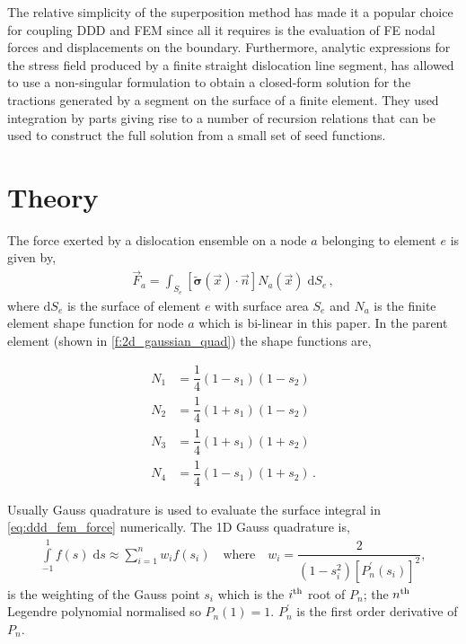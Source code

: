 \documentclass[11pt]{iopart}
\begin{document}
The relative simplicity of the superposition method has made it a popular choice for coupling DDD and FEM since all it requires is the evaluation of FE nodal forces and displacements on the boundary. Furthermore, analytic expressions for the stress field produced by a finite straight dislocation line segment, has allowed \citet{Queyreau} to use a non-singular formulation to obtain a closed-form solution for the tractions generated by a segment on the surface of a finite element. They used integration by parts giving rise to a number of recursion relations that can be used to construct the full solution from a small set of seed functions.

\section{Theory}\label{s:theory}

The force exerted by a dislocation ensemble on a node $a$ belonging to element $e$ is given by,
%
\begin{align}
    \vec{F}_{a} = \int_{S_{e}} \left[\tilde{\bm{\sigma}}(\vec{x}) \cdot \vec{n}\right] N_{a}(\vec{x})\; \mathrm{d}S_{e}\,,
    \label{eq:ddd_fem_force}
\end{align}
%
where $\mathrm{d}S_{e}$ is the surface of element $e$ with surface area $S_{e}$ and $N_{a}$ is the finite element shape function for node $a$ which is bi-linear in this paper. In the parent element (shown in \cref{f:2d_gaussian_quad}) the shape functions are,

\begin{align}
    \label{eq:shape_function}
    N_{1} & = \dfrac{1}{4}(1-s_1)(1-s_2)             \\
    N_{2} & = \dfrac{1}{4}(1+s_1)(1-s_2)\nonumber    \\
    N_{3} & = \dfrac{1}{4}(1+s_1)(1+s_2)\nonumber    \\
    N_{4} & = \dfrac{1}{4}(1-s_1)(1+s_2)\nonumber\,.
\end{align}

Usually Gauss quadrature is used to evaluate the surface integral in \cref{eq:ddd_fem_force} numerically. The 1D Gauss quadrature is,
%
\begin{align}
    \label{eq:gauss_leg}
    \int\limits_{-1}^{1} f(s)\;\mathrm{d}s \approx \sum\limits_{i=1}^{n} w_{i} f(s_{i}) \quad \textrm{where}\quad
    w_{i} = \dfrac{2}{\left(1-s_{i}^{2}\right) \left[P_{n}^{'}\left(s_{i}\right)\right]^{2}},
\end{align}
%
is the weighting of the Gauss point $s_{i}$ which is the $i\textsuperscript{th}$ root of $P_{n}$; the $n\textsuperscript{th}$ Legendre polynomial normalised so $P_{n}(1) = 1$. $P_{n}^{'}$ is the first order derivative of $P_{n}$.
\end{document}
